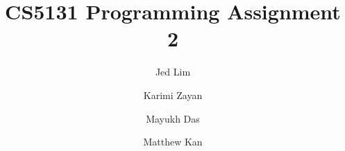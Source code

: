 \documentclass[runningheads]{llncs}
\begin{document}
	\title{CS5131 Programming Assignment 2} 
	\author{Jed Lim \and Karimi Zayan \and Mayukh Das \and Matthew Kan}
	\maketitle
	
	
	
	
	\newpage
	
	\pagebreak 
	
	
	
\end{document}
